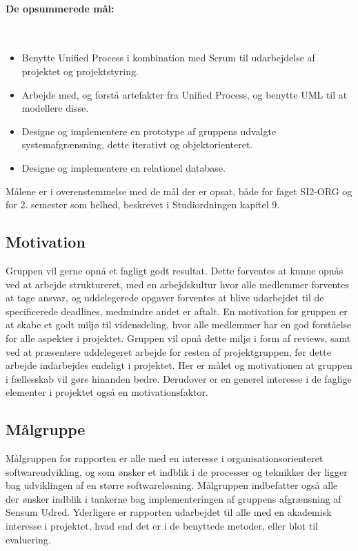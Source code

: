 \documentclass[../main.tex]{subfiles}
\begin{document}
\paragraph{De opsummerede mål:} \mbox{} \\
\begin{itemize}
\item Benytte Unified Process i kombination med Scrum til udarbejdelse af projektet og projektstyring.
\item Arbejde med, og forstå artefakter fra Unified Process, og benytte UML til at modellere disse.
\item Designe og implementere en prototype af gruppens udvalgte systemafgrænsning, dette iterativt og objektorienteret.
\item Designe og implementere en relationel database.
\end{itemize}

Målene er i overenstemmelse med de mål der er opsat, både for faget SI2-ORG og for 2. semester som helhed, beskrevet i Studiordningen kapitel 9.

\subsection{Motivation}

Gruppen vil gerne opnå et fagligt godt resultat. Dette forventes at kunne opnås ved at arbejde struktureret, med en arbejdskultur hvor alle medlemmer forventes at tage ansvar, og uddelegerede opgaver forventes at blive udarbejdet til de specificerede deadlines, medmindre andet er aftalt. 
En motivation for gruppen er at skabe et godt miljø til vidensdeling, hvor alle medlemmer har en god forståelse for alle aspekter i projektet. Gruppen vil opnå dette miljø i form af reviews, samt ved at præsentere uddelegeret arbejde for resten af projektgruppen, før dette arbejde indarbejdes endeligt i projektet. Her er målet og motivationen at gruppen i fællesskab vil gøre hinanden bedre.
Derudover er en generel interesse i de faglige elementer i projektet også en motivationsfaktor. 

\subsection{Målgruppe}
Målgruppen for rapporten er alle med en interesse i organisationsorienteret softwareudvikling, og som ønsker et indblik i de processer og teknikker der ligger bag udviklingen af en større softwareløsning.
Målgruppen indbefatter også alle der ønsker indblik i tankerne bag implementeringen af gruppens afgrænsning af Sensum Udred.
Yderligere er rapporten udarbejdet til alle med en akademisk interesse i projektet, hvad end det er i de benyttede metoder, eller blot til evaluering.
\newpage
\end{document}

